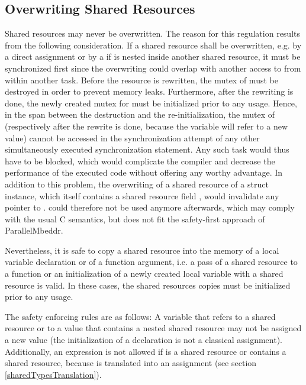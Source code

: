 \subsection{Overwriting Shared Resources}
\label{overwritingSharedResources}
Shared resources may never be overwritten. The reason for this regulation results from the following consideration. If a shared resource  shall be overwritten, e.g. by a direct assignment or by a  if  is nested inside another shared resource, it must be synchronized first since the overwriting could overlap with another access to  from within another task. Before the resource is rewritten, the mutex of  must be destroyed in order to prevent memory leaks. Furthermore, after the rewriting is done, the newly created mutex for  must be initialized prior to any usage. Hence, in the span between the destruction and the re-initialization, the mutex of  (respectively  after the rewrite is done, because the variable will refer to a new value) cannot be accessed in the synchronization attempt of any other simultaneously executed synchronization statement. Any such task would thus have to be blocked, which would complicate the compiler and decrease the performance of the executed code without offering any worthy advantage. In addition to this problem, the overwriting of a shared resource of a struct instance, which itself contains a shared resource field , would invalidate any pointer  to .  could therefore not be used anymore afterwards, which may comply with the usual C semantics, but does not fit the safety-first approach of ParallelMbeddr.

Nevertheless, it is safe to copy a shared resource into the memory of a local variable declaration or of a function argument, i.e. a pass of a shared resource to a function or an initialization of a newly created local variable with a shared resource is valid. In these cases, the shared resources copies must be initialized prior to any usage.

The safety enforcing rules are as follows: A variable that refers to a shared resource or to a value that contains a nested shared resource may not be assigned a new value (the initialization of a declaration is not a classical assignment). Additionally, an expression  is not allowed if  is a shared resource or contains a shared resource, because  is translated into an assignment (see section \ref{sharedTypesTranslation}).

